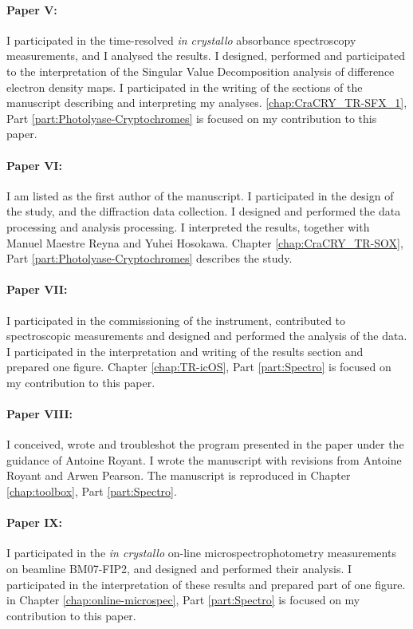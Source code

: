\documentclass{report}
\begin{document}
\paragraph{Paper V:} I participated in the time-resolved \textit{in crystallo} absorbance spectroscopy measurements, and I analysed the results. I designed, performed and participated to the interpretation of the Singular Value Decomposition analysis of difference electron density maps. I participated in the writing of the sections of the manuscript describing and interpreting my analyses. \ref{chap:CraCRY_TR-SFX_1}, Part \ref{part:Photolyase-Cryptochromes} is focused on my contribution to this paper.

\paragraph{Paper VI:} I am listed as the first author of the manuscript. I participated in the design of the study, and the diffraction data collection. I designed and performed the data processing and analysis processing. I interpreted the results, together with Manuel Maestre Reyna and Yuhei Hosokawa. Chapter \ref{chap:CraCRY_TR-SOX}, Part \ref{part:Photolyase-Cryptochromes} describes the study. 

\paragraph{Paper VII:} I participated in the commissioning of the instrument, contributed to spectroscopic measurements and designed and performed the analysis of the data. I participated in the interpretation and writing of the results section and prepared one figure. Chapter \ref{chap:TR-icOS}, Part \ref{part:Spectro} is focused on my contribution to this paper.

\paragraph{Paper VIII:} I conceived, wrote and troubleshot the program presented in the paper under the guidance of Antoine Royant. I wrote the manuscript with revisions from Antoine Royant and Arwen Pearson. The manuscript is reproduced in Chapter \ref{chap:toolbox}, Part \ref{part:Spectro}. 

\paragraph{Paper IX:} I participated in the \textit{in crystallo} on-line microspectrophotometry measurements on beamline BM07-FIP2, and designed and performed their analysis. I participated in the interpretation of these results and prepared part of one figure. in Chapter \ref{chap:online-microspec}, Part \ref{part:Spectro} is focused on my contribution to this paper.
\end{document}
